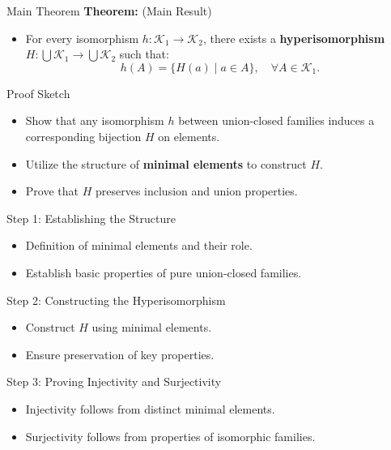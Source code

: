 \documentclass{beamer}
\begin{document}
\begin{frame}{Main Theorem}
	\textbf{Theorem:} (Main Result)
	\begin{itemize}
		\item For every isomorphism $h: \mathcal{K}_1 \to \mathcal{K}_2$, there exists a \textbf{hyperisomorphism} $H: \bigcup \mathcal{K}_1 \to \bigcup \mathcal{K}_2$ such that:
		      \[ h(A) = \{ H(a) \mid a \in A \}, \quad \forall A \in \mathcal{K}_1. \]
	\end{itemize}
\end{frame}

\begin{frame}{Proof Sketch}
	\begin{itemize}
		\item Show that any isomorphism $h$ between union-closed families induces a corresponding bijection $H$ on elements.
		\item Utilize the structure of \textbf{minimal elements} to construct $H$.
		\item Prove that $H$ preserves inclusion and union properties.
	\end{itemize}
\end{frame}

\begin{frame}{Step 1: Establishing the Structure}
	\begin{itemize}
		\item Definition of minimal elements and their role.
		\item Establish basic properties of pure union-closed families.
	\end{itemize}
\end{frame}

\begin{frame}{Step 2: Constructing the Hyperisomorphism}
	\begin{itemize}
		\item Construct $H$ using minimal elements.
		\item Ensure preservation of key properties.
	\end{itemize}
\end{frame}

\begin{frame}{Step 3: Proving Injectivity and Surjectivity}
	\begin{itemize}
		\item Injectivity follows from distinct minimal elements.
		\item Surjectivity follows from properties of isomorphic families.
	\end{itemize}
\end{frame}
\end{document}
